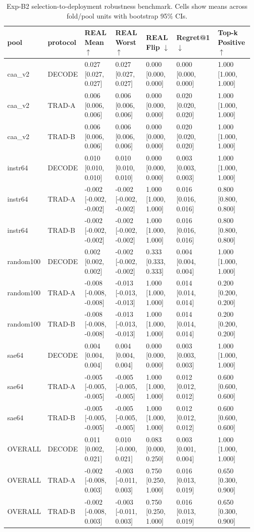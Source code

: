 \begin{table}[t]
\centering
\begin{tabular}{lllllll}
\toprule
pool & protocol & REAL Mean $\uparrow$ & REAL Worst $\uparrow$ & REAL Flip $\downarrow$ & Regret@1 $\downarrow$ & Top-k Positive $\uparrow$ \\
\midrule
caa_v2 & DECODE & 0.027 [0.027, 0.027] & 0.027 [0.027, 0.027] & 0.000 [0.000, 0.000] & 0.000 [0.000, 0.000] & 1.000 [1.000, 1.000] \\
caa_v2 & TRAD-A & 0.006 [0.006, 0.006] & 0.006 [0.006, 0.006] & 0.000 [0.000, 0.000] & 0.020 [0.020, 0.020] & 1.000 [1.000, 1.000] \\
caa_v2 & TRAD-B & 0.006 [0.006, 0.006] & 0.006 [0.006, 0.006] & 0.000 [0.000, 0.000] & 0.020 [0.020, 0.020] & 1.000 [1.000, 1.000] \\
instr64 & DECODE & 0.010 [0.010, 0.010] & 0.010 [0.010, 0.010] & 0.000 [0.000, 0.000] & 0.003 [0.003, 0.003] & 1.000 [1.000, 1.000] \\
instr64 & TRAD-A & -0.002 [-0.002, -0.002] & -0.002 [-0.002, -0.002] & 1.000 [1.000, 1.000] & 0.016 [0.016, 0.016] & 0.800 [0.800, 0.800] \\
instr64 & TRAD-B & -0.002 [-0.002, -0.002] & -0.002 [-0.002, -0.002] & 1.000 [1.000, 1.000] & 0.016 [0.016, 0.016] & 0.800 [0.800, 0.800] \\
random100 & DECODE & 0.002 [0.002, 0.002] & -0.002 [-0.002, -0.002] & 0.333 [0.333, 0.333] & 0.004 [0.004, 0.004] & 1.000 [1.000, 1.000] \\
random100 & TRAD-A & -0.008 [-0.008, -0.008] & -0.013 [-0.013, -0.013] & 1.000 [1.000, 1.000] & 0.014 [0.014, 0.014] & 0.200 [0.200, 0.200] \\
random100 & TRAD-B & -0.008 [-0.008, -0.008] & -0.013 [-0.013, -0.013] & 1.000 [1.000, 1.000] & 0.014 [0.014, 0.014] & 0.200 [0.200, 0.200] \\
sae64 & DECODE & 0.004 [0.004, 0.004] & 0.004 [0.004, 0.004] & 0.000 [0.000, 0.000] & 0.003 [0.003, 0.003] & 1.000 [1.000, 1.000] \\
sae64 & TRAD-A & -0.005 [-0.005, -0.005] & -0.005 [-0.005, -0.005] & 1.000 [1.000, 1.000] & 0.012 [0.012, 0.012] & 0.600 [0.600, 0.600] \\
sae64 & TRAD-B & -0.005 [-0.005, -0.005] & -0.005 [-0.005, -0.005] & 1.000 [1.000, 1.000] & 0.012 [0.012, 0.012] & 0.600 [0.600, 0.600] \\
OVERALL & DECODE & 0.011 [0.002, 0.021] & 0.010 [-0.000, 0.021] & 0.083 [0.000, 0.250] & 0.003 [0.001, 0.004] & 1.000 [1.000, 1.000] \\
OVERALL & TRAD-A & -0.002 [-0.008, 0.003] & -0.003 [-0.011, 0.003] & 0.750 [0.250, 1.000] & 0.016 [0.013, 0.019] & 0.650 [0.300, 0.900] \\
OVERALL & TRAD-B & -0.002 [-0.008, 0.003] & -0.003 [-0.011, 0.003] & 0.750 [0.250, 1.000] & 0.016 [0.013, 0.019] & 0.650 [0.300, 0.900] \\
\bottomrule
\end{tabular}

\caption{Exp-B2 selection-to-deployment robustness benchmark. Cells show means across fold/pool units with bootstrap 95\% CIs.}
\label{tab:b2_select_deploy}
\end{table}